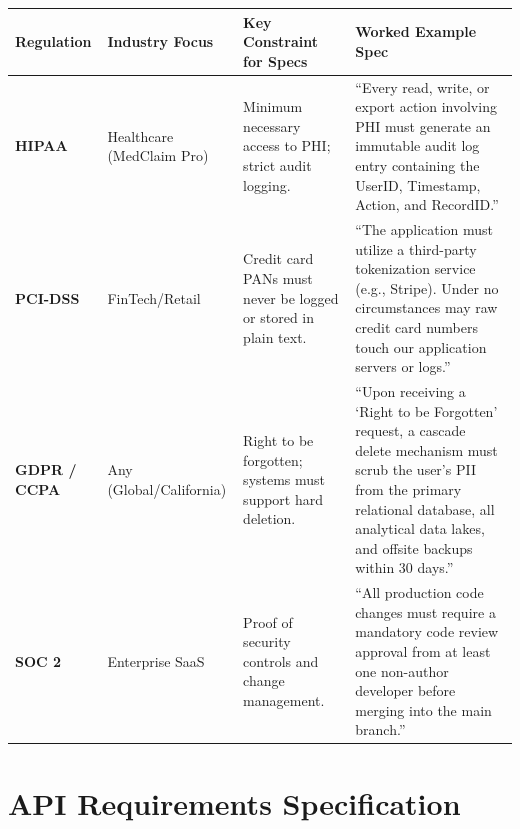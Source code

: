 \documentclass[
  11pt,
  openany,
  oneside]{book}
\begin{document}
\begin{longtable}[]{@{}
  >{\raggedright\arraybackslash}p{}
  >{\raggedright\arraybackslash}p{}
  >{\raggedright\arraybackslash}p{}
  >{\raggedright\arraybackslash}p{}@{}}
\toprule\noalign{}
\begin{minipage}[b]{\linewidth}\raggedright
Regulation
\end{minipage} & \begin{minipage}[b]{\linewidth}\raggedright
Industry Focus
\end{minipage} & \begin{minipage}[b]{\linewidth}\raggedright
Key Constraint for Specs
\end{minipage} & \begin{minipage}[b]{\linewidth}\raggedright
Worked Example Spec
\end{minipage} \\
\midrule\noalign{}
\endhead
\bottomrule\noalign{}
\endlastfoot
\textbf{HIPAA} & Healthcare (MedClaim Pro) & Minimum necessary access to
PHI; strict audit logging. & ``Every read, write, or export action
involving PHI must generate an immutable audit log entry containing the
UserID, Timestamp, Action, and RecordID.'' \\
\textbf{PCI-DSS} & FinTech/Retail & Credit card PANs must never be
logged or stored in plain text. & ``The application must utilize a
third-party tokenization service (e.g., Stripe). Under no circumstances
may raw credit card numbers touch our application servers or logs.'' \\
\textbf{GDPR / CCPA} & Any (Global/California) & Right to be forgotten;
systems must support hard deletion. & ``Upon receiving a `Right to be
Forgotten' request, a cascade delete mechanism must scrub the user's PII
from the primary relational database, all analytical data lakes, and
offsite backups within 30 days.'' \\
\textbf{SOC 2} & Enterprise SaaS & Proof of security controls and change
management. & ``All production code changes must require a mandatory
code review approval from at least one non-author developer before
merging into the main branch.'' \\
\end{longtable}

\section{API Requirements
Specification}\label{api-requirements-specification}
\end{document}
